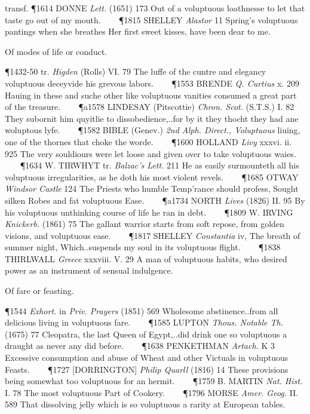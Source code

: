 \begin{description}[wide, labelwidth=!, labelindent=0pt]
\begin{myenumerate}
transf. \P 1614 DONNE  \textit{Lett.} (1651) 173 Out of a voluptuous loathnesse to let that taste go out of my mouth.    
\P 1815 SHELLEY  \textit{Alastor} 11 Spring's voluptuous pantings when she breathes Her first sweet kisses, have been dear to me.

 Of modes of life or conduct.

\P 1432-50 tr.  \textit{Higden} (Rolls) VI. 79 The luffe of the cuntre and elegancy voluptuous deceyvide his grevous labors.    
\P 1553 BRENDE  \textit{Q. Curtius} x. 209 Hauing in these and suche other like voluptuous vanities consumed a great part of the treasure.    
\P a1578 LINDESAY  (Pitscottie) \textit{Chron. Scot.} (S.T.S.) I. 82 They subornit him quyitlie to dissobedience,..for by it they thocht they had ane woluptous lyfe.    
\P 1582 BIBLE  (Genev.) \textit{2nd Alph. Direct., Voluptuous} liuing, one of the thornes that choke the worde.    
\P 1600 HOLLAND  \textit{Livy} xxxvi. ii. 925 The very souldiours were let loose and given over to take voluptuous waies.    
\P 1634 W. TIRWHYT tr.  \textit{Balzac's Lett.} 211 He as easily surmounteth all his voluptuous irregularities, as he doth his most violent revels.    
\P 1685 OTWAY  \textit{Windsor Castle} 124 The Priests who humble Temp'rance should profess, Sought silken Robes and fat voluptuous Ease.    
\P a1734 NORTH  \textit{Lives} (1826) II. 95 By his voluptuous unthinking course of life he ran in debt.    
\P 1809 W. IRVING  \textit{Knickerb.} (1861) 75 The gallant warrior starts from soft repose, from golden visions, and voluptuous ease.    
\P 1817 SHELLEY  \textit{Constantia} iv, The breath of summer night, Which..suspends my soul in its voluptuous flight.    
\P 1838 THIRLWALL  \textit{Greece} xxxviii. V. 29 A man of voluptuous habits, who desired power as an instrument of sensual indulgence.

 Of fare or feasting.

\P 1544  \textit{Exhort.} in \textit{Priv. Prayers} (1851) 569 Wholesome abstinence..from all delicious living in voluptuous fare.    
\P 1585 LUPTON  \textit{Thous. Notable Th.} (1675) 77 Cleopatra, the last Queen of Egypt,..did drink one so voluptuous a draught as never any did before.    
\P 1638 PENKETHMAN  \textit{Artach.} K 3 Excessive consumption and abuse of Wheat and other Victuals in voluptuous Feasts.    
\P 1727 [DORRINGTON]  \textit{Philip Quarll} (1816) 14 These provisions being somewhat too voluptuous for an hermit.    
\P 1759 B. MARTIN  \textit{Nat. Hist.} I. 78 The most voluptuous Part of Cookery.    
\P 1796 MORSE  \textit{Amer. Geog.} II. 589 That dissolving jelly which is so voluptuous a rarity at European tables.


\end{myenumerate}
\end{description}
